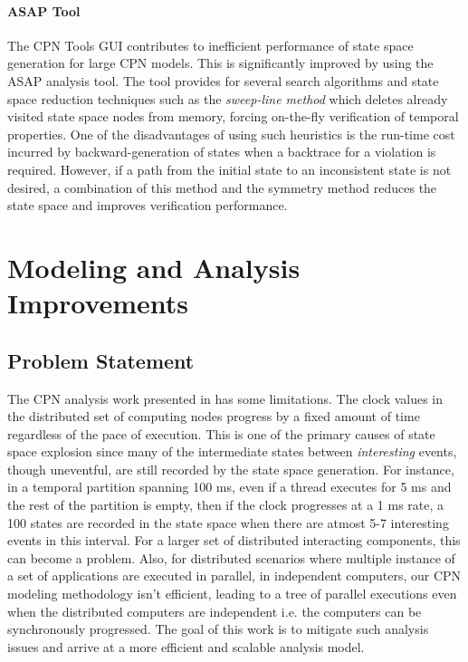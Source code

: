 \paragraph{ASAP Tool}
The CPN Tools GUI contributes to inefficient performance of state space generation for large CPN models. This is significantly improved by using the ASAP \cite{ASAP} analysis tool. The tool provides for several search algorithms and state space reduction techniques such as the \emph{sweep-line method} \cite{Christensen2001} which deletes already visited state space nodes from memory, forcing on-the-fly verification of temporal properties. One of the disadvantages of using such heuristics is the run-time cost incurred by backward-generation of states when a backtrace for a violation is required. However, if a path from the initial state to an inconsistent state is not desired, a combination of this method and the symmetry method reduces the state space and improves verification performance. 

\section{Modeling and Analysis Improvements}
\label{sec:Improvements}

\subsection{Problem Statement}

The CPN analysis work presented in \cite{kumar2014colored} has some limitations. The clock values in the distributed set of computing nodes progress by a fixed amount of time regardless of the pace of execution. This is one of the primary causes of state space explosion since many of the intermediate states between \emph{interesting} events, though uneventful, are still recorded by the state space generation. For instance, in a temporal partition spanning 100 ms, even if a thread executes for 5 ms and the rest of the partition is empty, then if the clock progresses at a 1 ms rate, a 100 states are recorded in the state space when there are atmost 5-7 interesting events in this interval. For a larger set of distributed interacting components, this can become a problem. Also, for distributed scenarios where multiple instance of a set of applications are executed in parallel, in independent computers, our CPN modeling methodology isn't efficient, leading to a tree of parallel executions even when the distributed computers are independent i.e. the computers can be synchronously progressed. The goal of this work is to mitigate such analysis issues and arrive at a more efficient and scalable analysis model. 


